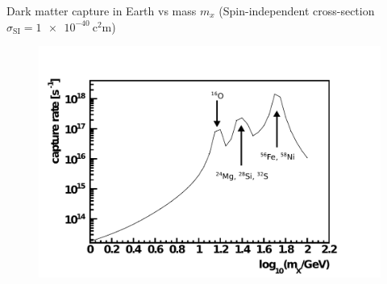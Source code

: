 \documentclass[14pt]{beamer}
\begin{document}
\begin{frame}{Dark matter capture in Earth vs mass $m_x$}
	{(Spin-independent cross-section $\sigma_{\mathrm{SI}} =
	\SI{1e-40}{\square\centi\meter}$)}
	\begin{figure}
		\centering
		\includegraphics[width=0.95\linewidth]{wimp_capture_rate.pdf}
	\end{figure}
\end{frame}
\end{document}
